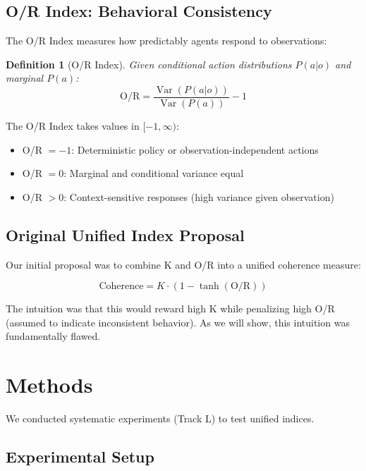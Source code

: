 \documentclass[twoside]{article}
\DeclareMathOperator{\Var}{Var}
\newtheorem{definition}{Definition}
\theoremstyle{remark}
\begin{document}
\subsection{O/R Index: Behavioral Consistency}

The O/R Index measures how predictably agents respond to observations:

\begin{definition}[O/R Index]
Given conditional action distributions $P(a|o)$ and marginal $P(a)$:
\begin{equation}
\text{O/R} = \frac{\Var(P(a|o))}{\Var(P(a))} - 1
\end{equation}
\end{definition}

The O/R Index takes values in $[-1, \infty)$:
\begin{itemize}
    \item O/R $= -1$: Deterministic policy or observation-independent actions
    \item O/R $= 0$: Marginal and conditional variance equal
    \item O/R $> 0$: Context-sensitive responses (high variance given observation)
\end{itemize}

\subsection{Original Unified Index Proposal}

Our initial proposal was to combine K and O/R into a unified coherence measure:

\begin{equation}
\text{Coherence} = K \cdot (1 - \tanh(\text{O/R}))
\end{equation}

The intuition was that this would reward high K while penalizing high O/R
(assumed to indicate inconsistent behavior). As we will show, this intuition
was fundamentally flawed.

\section{Methods}

We conducted systematic experiments (Track L) to test unified indices.

\subsection{Experimental Setup}
\end{document}
